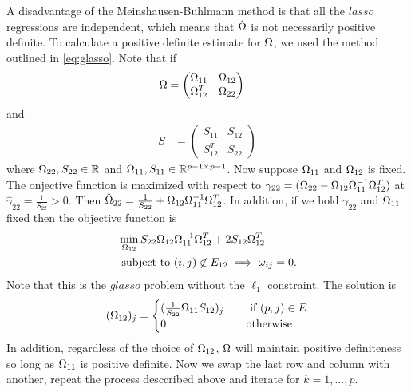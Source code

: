 \documentclass[12pt, leqno]{article}
\let\oldhat\hat
\renewcommand{\hat}[1]{\oldhat{{#1}}}
\def\om{\ensuremath\Omega}
\begin{document}
A disadvantage of
the Meinshausen-Buhlmann method is that all the $lasso$
regressions are independent, which means that $\hat{\om}$ is not necessarily positive
definite. 
To calculate a positive definite estimate for $\om$,
we used the method outlined in \ref{eq:glasso}. Note that if
\begin{align*}
\om &= \begin{pmatrix} \om_{11} & \om_{12} \\
\om_{12}^T& \om_{22}
\end{pmatrix}
\end{align*}
and 
\begin{align*}
S &= \begin{pmatrix} S_{11} & S_{12} \\
S_{12}^T& S_{22}
\end{pmatrix}
\end{align*}
where $\om_{22}, S_{22}  \in \mathbb{R}$ and $\om_{11},S_{11}  \in \mathbb{R}^{p-1 \times
p-1}$.
Now suppose $\om_{11}$ and $\om_{12}$ is fixed. The onjective function
is maximized with
respect to $\gamma_{22}
= (\om_{22}-\om_{12}\om_{11}^{-1}\om_{12}^T)$ at $\hat{\gamma}_{22} =
\frac{1}{S_{22}} >0$. Then $\hat{\om}_{22} = \frac{1}{S_{22}} + \om_{12}\om_{11}^{-1}\om_{12}^T$.
In addition, if we hold $\gamma_{22}$ and $\om_{11}$ fixed then
the objective function is
\begin{align*}
& \min_{\om_{12}} S_{22}\om_{12}\om_{11}^{-1}\om_{12}^T +
  2S_{12}\om_{12}^T \\
& \text{ subject to } 
(i,j) \not\in E_{12} \implies \omega_{ij} = 0.
\end{align*}
Note that this is the $glasso$ problem without
the $\ell_1$ constraint. The solution is 
\begin{align*}
(\om_{12})_j = \begin{cases} (\frac{1}{S_{22}}\om_{11} S_{12})_j
  \quad& \text{
  if } (p,j) \in E \\
0  &\text{otherwise} \end{cases}
\end{align*}
In addition, regardless of the choice of $\om_{12}$, $\om$ will
maintain positive definiteness so long as $\om_{11}$ is positive
definite. Now we swap the last row and column with another, repeat the
process desccribed above and iterate
for $k = 1,...,p$. 
\end{document}
